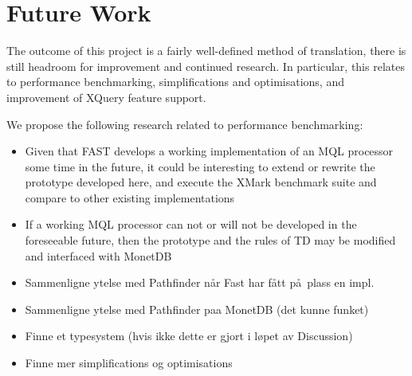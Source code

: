 \chapter{Future Work}
\label{chapter:future}
The outcome of this project is a fairly well-defined method of translation,
there is still headroom for improvement and continued research. In particular,
this relates to performance benchmarking, simplifications and optimisations,
and improvement of XQuery feature support.

We propose the following research related to performance benchmarking:
\begin{itemize}
  \item Given that FAST develops a working implementation of an MQL processor
  some time in the future, it could be interesting to extend or rewrite the
  prototype developed here, and execute the XMark benchmark suite and compare
  to other existing implementations
  \item If a working MQL processor can not or will not be developed in the
  foreseeable future, then the prototype and the rules of TD may be modified
  and interfaced with MonetDB
\end{itemize}


\begin{itemize}	
  \item Sammenligne ytelse med Pathfinder n\aa r Fast har f\aa tt p\aa~plass en impl.
  \item Sammenligne ytelse med Pathfinder paa MonetDB (det kunne funket) 
  \item Finne et typesystem (hvis ikke dette er gjort i l\o pet av Discussion)
  \item Finne mer simplifications og optimisations
\end{itemize}